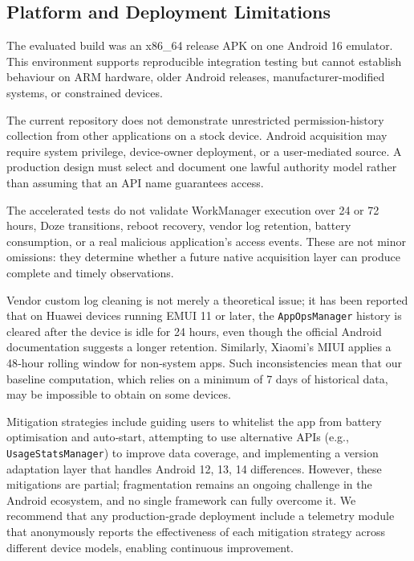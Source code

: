 \subsection{Platform and Deployment Limitations}

The evaluated build was an x86\_64 release APK on one Android 16 emulator. This environment supports reproducible integration testing but cannot establish behaviour on ARM hardware, older Android releases, manufacturer-modified systems, or constrained devices.

The current repository does not demonstrate unrestricted permission-history collection from other applications on a stock device. Android acquisition may require system privilege, device-owner deployment, or a user-mediated source. A production design must select and document one lawful authority model rather than assuming that an API name guarantees access.

The accelerated tests do not validate WorkManager execution over 24 or 72 hours, Doze transitions, reboot recovery, vendor log retention, battery consumption, or a real malicious application's access events. These are not minor omissions: they determine whether a future native acquisition layer can produce complete and timely observations.

Vendor custom log cleaning is not merely a theoretical issue; it has been reported that on Huawei devices running EMUI 11 or later, the \texttt{AppOpsManager} history is cleared after the device is idle for 24 hours, even though the official Android documentation suggests a longer retention. Similarly, Xiaomi's MIUI applies a 48‑hour rolling window for non‑system apps. Such inconsistencies mean that our baseline computation, which relies on a minimum of 7 days of historical data, may be impossible to obtain on some devices.

Mitigation strategies include guiding users to whitelist the app from battery optimisation and auto‑start, attempting to use alternative APIs (e.g., \texttt{UsageStatsManager}) to improve data coverage, and implementing a version adaptation layer that handles Android 12, 13, 14 differences. However, these mitigations are partial; fragmentation remains an ongoing challenge in the Android ecosystem, and no single framework can fully overcome it. We recommend that any production‑grade deployment include a telemetry module that anonymously reports the effectiveness of each mitigation strategy across different device models, enabling continuous improvement.

